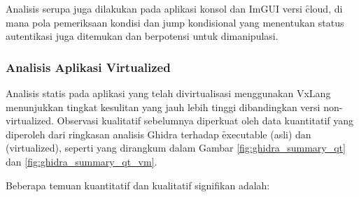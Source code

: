 Analisis serupa juga dilakukan pada aplikasi konsol dan ImGUI versi \f{cloud}, di mana pola pemeriksaan kondisi dan jump kondisional yang menentukan status autentikasi juga ditemukan dan berpotensi untuk dimanipulasi.

\subsubsection{Analisis Aplikasi Virtualized}

Analisis statis pada aplikasi yang telah divirtualisasi menggunakan VxLang menunjukkan tingkat kesulitan yang jauh lebih tinggi dibandingkan versi non-virtualized. Observasi kualitatif sebelumnya diperkuat oleh data kuantitatif yang diperoleh dari ringkasan analisis Ghidra terhadap \f{executable}  (asli) dan  (virtualized), seperti yang dirangkum dalam Gambar \ref{fig:ghidra_summary_qt} dan \ref{fig:ghidra_summary_qt_vm}.

Beberapa temuan kuantitatif dan kualitatif signifikan adalah:

